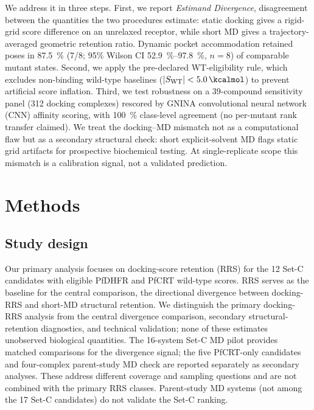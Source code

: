 \documentclass[11pt,a4paper]{article}
\begin{document}
We address it in three steps. First, we report \emph{Estimand Divergence}, disagreement between the quantities the two procedures estimate\citep{lundberg2021estimand}: static docking gives a rigid-grid score difference on an unrelaxed receptor, while short MD gives a trajectory-averaged geometric retention ratio. Dynamic pocket accommodation retained poses in \qty{87.5}{\percent} (7/8; 95\% Wilson CI \qtyrange{52.9}{97.8}{\percent}, $n=\num{8}$) of comparable mutant states. Second, we apply the pre-declared WT-eligibility rule, which excludes non-binding wild-type baselines ($|S_{\mathrm{WT}}| < \qty{5.0}{\kcalmol}$) to prevent artificial score inflation. Third, we test robustness on a 39-compound sensitivity panel (\num{312} docking complexes) rescored by GNINA convolutional neural network (CNN) affinity scoring, with \qty{100}{\percent} class-level agreement (no per-mutant rank transfer claimed). We treat the docking--MD mismatch not as a computational flaw but as a secondary structural check: short explicit-solvent MD flags static grid artifacts for prospective biochemical testing. At single-replicate scope this mismatch is a calibration signal, not a validated prediction.


\section{Methods}

\subsection{Study design}

Our primary analysis focuses on docking-score retention (RRS) for the 12 Set-C candidates with eligible PfDHFR and PfCRT wild-type scores. RRS serves as the baseline for the central comparison, the directional divergence between docking-RRS and short-MD structural retention. We distinguish the primary docking-RRS analysis from the central divergence comparison, secondary structural-retention diagnostics, and technical validation; none of these estimates unobserved biological quantities. The 16-system Set-C MD pilot provides matched comparisons for the divergence signal; the five PfCRT-only candidates and four-complex parent-study MD check are reported separately as secondary analyses. These address different coverage and sampling questions and are not combined with the primary RRS classes. Parent-study MD systems (not among the 17 Set-C candidates) do not validate the Set-C ranking.
\end{document}
